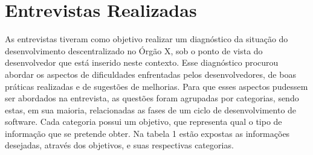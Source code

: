 \section{Entrevistas Realizadas}
As entrevistas tiveram como objetivo realizar um diagnóstico da situação do desenvolvimento descentralizado no Órgão X, sob o ponto de vista do desenvolvedor que está inserido neste contexto. Esse diagnóstico procurou abordar os aspectos de dificuldades enfrentadas pelos desenvolvedores, de boas práticas realizadas e de sugestões de melhorias. Para que esses aspectos pudessem ser abordados na entrevista, as questões foram agrupadas por categorias, sendo estas, em sua maioria, relacionadas as fases de um ciclo de desenvolvimento de software. Cada categoria possui um objetivo, que representa qual o tipo de informação que se pretende obter. Na tabela 1 estão expostas as informações desejadas, através dos objetivos, e suas respectivas categorias.

